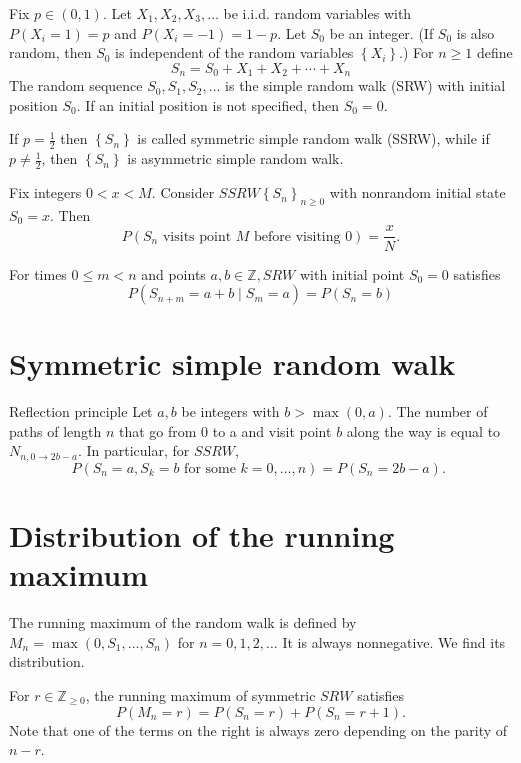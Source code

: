 \documentclass[11pt]{elegantbook}
\begin{document}
\begin{definition}
Fix $p \in(0,1)$. Let $X_1, X_2, X_3, \ldots$ be i.i.d. random variables with $P\left(X_i=1\right)=p$ and $P\left(X_i=-1\right)=1-p$. Let $S_0$ be an integer. (If $S_0$ is also random, then $S_0$ is independent of the random variables $\left\{X_i\right\}$.) For $n \geq 1$ define
$$
S_n=S_0+X_1+X_2+\cdots+X_n
$$
The random sequence $S_0, S_1, S_2, \ldots$ is the simple random walk (SRW) with initial position $S_0$. If an initial position is not specified, then $S_0=0$.

If $p=\frac{1}{2}$ then $\left\{S_n\right\}$ is called symmetric simple random walk (SSRW), while if $p \neq \frac{1}{2}$, then $\left\{S_n\right\}$ is asymmetric simple random walk.
\end{definition}

\begin{theorem}
Fix integers $0<x<M$. Consider $S S R W\left\{S_n\right\}_{n \geq 0}$ with nonrandom initial state $S_0=x$. Then
$$
P\left(S_n \text { visits point } M \text { before visiting } 0\right)=\frac{x}{N} .
$$
\end{theorem}
\begin{theorem}
 For times $0 \leq m<n$ and points $a, b \in \mathbb{Z}, S R W$ with initial point $S_0=0$ satisfies
$$
P\left(S_{n+m}=a+b \mid S_m=a\right)=P\left(S_n=b\right)
$$
\end{theorem}
\section{Symmetric simple random walk}
\begin{theorem}{Reflection principle}
 Let $a, b$ be integers with $b>\max (0, a)$. The number of paths of length $n$ that go from 0 to a and visit point $b$ along the way is equal to $N_{n, 0 \rightarrow 2 b-a}$. In particular, for $S S R W$,
$$
P\left(S_n=a, S_k=b \text { for some } k=0, \ldots, n\right)=P\left(S_n=2 b-a\right) \text {. }
$$
\end{theorem}
\section{Distribution of the running maximum}

The running maximum of the random walk is defined by $M_n=\max \left(0, S_1, \ldots, S_n\right)$ for $n=0,1,2, \ldots$ It is always nonnegative. We find its distribution.
\begin{theorem}
    For $r \in \mathbb{Z}_{\geq 0}$, the running maximum of symmetric $S R W$ satisfies
$$
P\left(M_n=r\right)=P\left(S_n=r\right)+P\left(S_n=r+1\right) .
$$
Note that one of the terms on the right is always zero depending on the parity of $n-r$.
\end{theorem}
\end{document}
